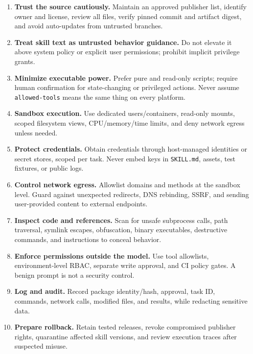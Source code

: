 \documentclass[
  10pt,
  letterpaper,
]{article}
\newcommand{\passthrough}[1]{#1}
\providecommand{\tightlist}{%
  \setlength{\itemsep}{0pt}\setlength{\parskip}{0pt}}
\begin{document}
\begin{enumerate}
\def\labelenumi{\arabic{enumi}.}
\tightlist
\item
  \textbf{Trust the source cautiously.} Maintain an approved publisher
  list, identify owner and license, review all files, verify pinned
  commit and artifact digest, and avoid auto-updates from untrusted
  branches.
\item
  \textbf{Treat skill text as untrusted behavior guidance.} Do not
  elevate it above system policy or explicit user permissions; prohibit
  implicit privilege grants.
\item
  \textbf{Minimize executable power.} Prefer pure and read-only scripts;
  require human confirmation for state-changing or privileged actions.
  Never assume \passthrough{\lstinline!allowed-tools!} means the same
  thing on every platform.
\item
  \textbf{Sandbox execution.} Use dedicated users/containers, read-only
  mounts, scoped filesystem views, CPU/memory/time limits, and deny
  network egress unless needed.
\item
  \textbf{Protect credentials.} Obtain credentials through host-managed
  identities or secret stores, scoped per task. Never embed keys in
  \passthrough{\lstinline!SKILL.md!}, assets, test fixtures, or public
  logs.
\item
  \textbf{Control network egress.} Allowlist domains and methods at the
  sandbox level. Guard against unexpected redirects, DNS rebinding,
  SSRF, and sending user-provided content to external endpoints.
\item
  \textbf{Inspect code and references.} Scan for unsafe subprocess
  calls, path traversal, symlink escapes, obfuscation, binary
  executables, destructive commands, and instructions to conceal
  behavior.
\item
  \textbf{Enforce permissions outside the model.} Use tool allowlists,
  environment-level RBAC, separate write approval, and CI policy gates.
  A benign prompt is not a security control.
\item
  \textbf{Log and audit.} Record package identity/hash, approval, task
  ID, commands, network calls, modified files, and results, while
  redacting sensitive data.
\item
  \textbf{Prepare rollback.} Retain tested releases, revoke compromised
  publisher rights, quarantine affected skill versions, and review
  execution traces after suspected misuse.
\end{enumerate}
\end{document}
